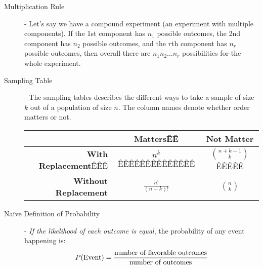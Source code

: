 \documentclass[10pt,landscape]{article}
\theoremstyle{definition}
\begin{document}
\begin{multicols}{3}
\begin{description}
    \item[Multiplication Rule] - Let's say we have a compound experiment (an experiment with multiple components). If the 1st component has $n_1$ possible outcomes, the 2nd component has $n_2$ possible outcomes, and the $r$th component has $n_r$ possible outcomes, then overall there are $n_1n_2 \dots n_r$ possibilities for the whole experiment.
    \item[Sampling Table] - The sampling tables describes the different ways to take a sample of size $k$ out of a population of size $n$. The column names denote whether order matters or not.\\
        \begin{center}
            \begin{tabular}{r|cc}
                 & \textbf{Matters}ÊÊ & \textbf{Not Matter} \\ \hline
                \textbf{With Replacement}ÊÊÊ & $\displaystyle n^k$ÊÊÊÊÊÊÊÊÊÊÊÊÊÊ & $\displaystyle{n+k-1 \choose k}$ÊÊÊÊÊ \\ 
                \textbf{Without Replacement} & $\displaystyle\frac{n!}{(n - k)!}$ & $\displaystyle{n \choose k}$
            \end{tabular}
        \end{center}
    \item[Na\"{i}ve Definition of Probability] - \emph{If the likelihood of each outcome is equal}, the probability of any event happening is:
        \[P(\textnormal{Event}) = \frac{\textnormal{number of favorable outcomes}}{\textnormal{number of outcomes}}\]
\end{description}


\end{multicols}
\end{document}
